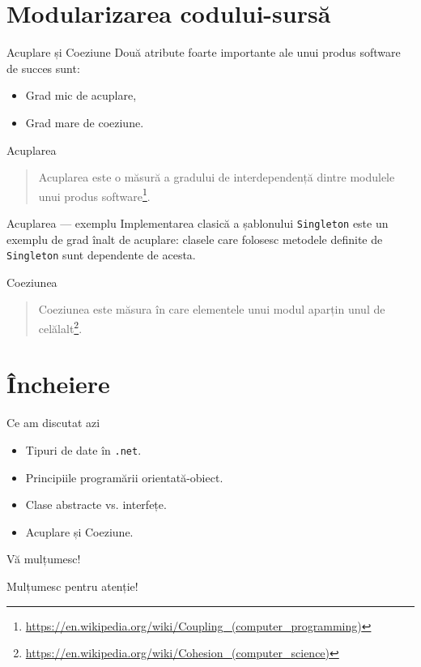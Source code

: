 \documentclass[presentation]{beamer}
\begin{document}
\section{Modularizarea codului-sursă}
\label{sec:orgab0f46b}
\begin{frame}[label={sec:org1b510fa}]{Acuplare și Coeziune}
Două atribute foarte importante ale unui produs software de succes sunt:
\begin{itemize}
\item Grad mic de acuplare,
\item Grad mare de coeziune.
\end{itemize}
\end{frame}
\begin{frame}[label={sec:org221c398}]{Acuplarea}
\begin{quotation} %
\alert{Acuplarea} este o măsură a gradului de interdependență dintre modulele unui produs software\footnote{\url{https://en.wikipedia.org/wiki/Coupling\_(computer\_programming)}}.
\end{quotation}
\end{frame}
\begin{frame}[label={sec:org9a8f16b},fragile]{Acuplarea --- exemplu}
 Implementarea clasică a șablonului \texttt{Singleton} este un exemplu de grad înalt de acuplare: clasele care folosesc metodele definite de \texttt{Singleton} sunt dependente de acesta.
\end{frame}
\begin{frame}[label={sec:orgd1bc093}]{Coeziunea}
\begin{quotation} %
\alert{Coeziunea} este măsura în care elementele unui modul aparțin unul de celălalt\footnote{\url{https://en.wikipedia.org/wiki/Cohesion\_(computer\_science)}}.
\end{quotation}
\end{frame}
\section{Încheiere}
\label{sec:org69e5fb6}
\begin{frame}[label={sec:orgb753a78},fragile]{Ce am discutat azi}
 \begin{itemize}
\item Tipuri de date în \texttt{.net}.
\item Principiile programării orientată-obiect.
\item Clase abstracte vs. interfețe.
\item Acuplare și Coeziune.
\end{itemize}
\end{frame}
\begin{frame}[label={sec:orga4345b2}]{Vă mulțumesc!}
\begin{center}
Mulțumesc pentru atenție!
\end{center}
\end{frame}
\end{document}
